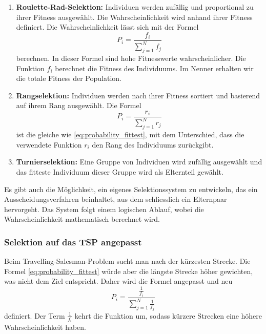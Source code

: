 \begin{enumerate}
    \item \textbf{Roulette-Rad-Selektion:} Individuen werden zufällig und
%
    proportional zu ihrer Fitness ausgewählt. Die Wahrscheinlichkeit wird 
    anhand ihrer Fitness definiert. Die Wahrscheinlichkeit lässt sich mit der Formel
    \begin{equation}
        P_i
        =
        \frac{f_i}{\sum_{j=1}^{N} f_j}
        \label{eq:probability_fittest}
    \end{equation}
    berechnen. In dieser Formel sind hohe Fitnesswerte wahrscheinlicher. Die Funktion \(f_i\) 
    berechnet die Fitness des Individuums. Im Nenner erhalten wir die totale Fitness der Population.
    \item \textbf{Rangselektion:} Individuen werden nach ihrer Fitness sortiert und basierend
%
    auf ihrem Rang ausgewählt. Die Formel 
    \begin{equation}
        P_i
        =
        \frac{r_i}{\sum_{j=1}^{N} r_j}
        \label{eq:probability_rating}
    \end{equation}
    ist die gleiche wie \eqref{eq:probability_fittest}, mit dem Unterschied, dass die verwendete Funktion 
    \(r_i\) den Rang des Individuums zurückgibt.
    \item \textbf{Turnierselektion:} Eine Gruppe von Individuen wird zufällig ausgewählt
%
    und das fitteste Individuum dieser Gruppe wird als Elternteil gewählt.
\end{enumerate}
Es gibt auch die Möglichkeit, ein eigenes Selektionssystem zu entwickeln, 
das ein Ausscheidungsverfahren beinhaltet, aus dem schliesslich ein 
Elternpaar hervorgeht. Das System folgt einem logischen Ablauf, wobei 
die Wahrscheinlichkeit mathematisch berechnet wird.

\subsubsection{Selektion auf das TSP angepasst
\label{buch:paper:varalg:subsection:selection_tsp}}
Beim Travelling-Salesman-Problem sucht man nach der kürzesten Strecke. Die Formel 
\eqref{eq:probability_fittest} würde aber die längste Strecke höher gewichten, was
nicht dem Ziel entspricht. Daher wird die Formel angepasst und neu 
\begin{equation}
    P_i
    =
    \frac{\frac{1}{f_i}}{\sum_{j=1}^{N} \frac{1}{f_j}}
    \label{eq:probability_fittest_tsp}
\end{equation}
definiert. Der Term \(\frac{1}{f_i}\) kehrt die Funktion um, sodass kürzere Strecken eine höhere
Wahrscheinlichkeit haben.
